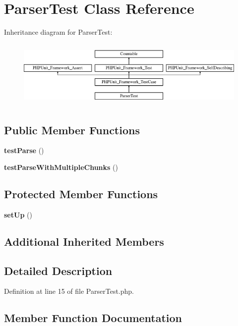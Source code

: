 \section{Parser\+Test Class Reference}
\label{class_sebastian_bergmann_1_1_diff_1_1_parser_test}
Inheritance diagram for Parser\+Test\+:\begin{figure}[H]
\begin{center}
\leavevmode
\includegraphics[height=3.303835cm]{class_sebastian_bergmann_1_1_diff_1_1_parser_test}
\end{center}
\end{figure}
\subsection*{Public Member Functions}
\begin{DoxyCompactItemize}
\item 
{\bf test\+Parse} ()
\item 
{\bf test\+Parse\+With\+Multiple\+Chunks} ()
\end{DoxyCompactItemize}
\subsection*{Protected Member Functions}
\begin{DoxyCompactItemize}
\item 
{\bf set\+Up} ()
\end{DoxyCompactItemize}
\subsection*{Additional Inherited Members}


\subsection{Detailed Description}


Definition at line 15 of file Parser\+Test.\+php.



\subsection{Member Function Documentation}
